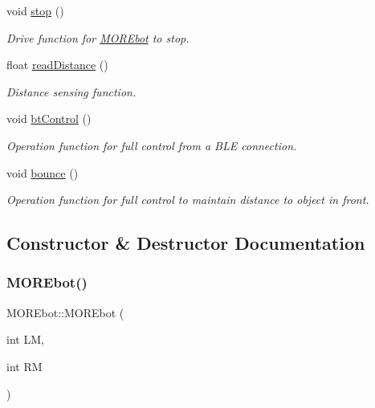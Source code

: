 \begin{DoxyCompactItemize}
void \mbox{\hyperlink{class_m_o_r_ebot_a53d65a7c2e54c5639c02d6c3872bc90c}{stop}} ()
\begin{DoxyCompactList}\small\item\em Drive function for \mbox{\hyperlink{class_m_o_r_ebot}{M\+O\+R\+Ebot}} to stop. \end{DoxyCompactList}\item 
float \mbox{\hyperlink{class_m_o_r_ebot_a5720fa06b9900f5b5aba574a7507e3dc}{read\+Distance}} ()
\begin{DoxyCompactList}\small\item\em Distance sensing function. \end{DoxyCompactList}\item 
void \mbox{\hyperlink{class_m_o_r_ebot_a2d8d46314854b184b6808d799019c5bb}{bt\+Control}} ()
\begin{DoxyCompactList}\small\item\em Operation function for full control from a B\+LE connection. \end{DoxyCompactList}\item 
void \mbox{\hyperlink{class_m_o_r_ebot_a2a685de71254397a986edaad9b22c8ef}{bounce}} ()
\begin{DoxyCompactList}\small\item\em Operation function for full control to maintain distance to object in front. \end{DoxyCompactList}\end{DoxyCompactItemize}


\subsection{Constructor \& Destructor Documentation}
\mbox{\label{class_m_o_r_ebot_a1939c1344ae853e5830c61ceaa54e536}} 
\subsubsection{\texorpdfstring{MOREbot()}{MOREbot()}\hspace{0.1cm}{\footnotesize\ttfamily [1/3]}}
{\footnotesize\ttfamily M\+O\+R\+Ebot\+::\+M\+O\+R\+Ebot (\begin{DoxyParamCaption}\item[{int}]{LM,  }\item[{int}]{RM }\end{DoxyParamCaption})}



